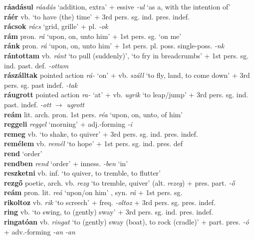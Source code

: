 \documentclass[11pt]{article}
\begin{document}
\textbf{ráadásul} \emph{ráadás} `addition, extra' + essive
  \emph{-ul} `as a, with the intention of' \\
\textbf{ráér} vb. `to have (the) time' + 3rd
pers. sg. ind. pres. indef. \\
\textbf{rácsok} \emph{rács} `grid, grille' + pl. \emph{-ok} \\
\textbf{rám} pron. \emph{rá} `upon, on, unto him' + 1st
pers. sg. `on me' \\
\textbf{ránk} pron. \emph{rá} `upon, on, unto him' + 1st
pers. pl. poss. single\hyp{}poss. \emph{-nk} \\
\textbf{rántottam} vb. \emph{ránt} `to pull (suddenly)', `to fry in
breadcrumbs' + 1st pers. sg. ind. past. def. \emph{-ottam} \\
\textbf{rászálltak} pointed action \emph{rá-} `on' + vb. \emph{száll}
`to fly, land, to come down' + 3rd pers. sg. past indef. \emph{-tak} \\
\textbf{ráugrott} pointed action \emph{ra-} `at' + vb. \emph{ugrik}
`to leap/jump' + 3rd pers. sg. ind. past. indef. \emph{-ott}
$\rightarrow$ \emph{ugrott} \\
\textbf{reám} lit. arch. pron. 1st pers. \emph{réa} `upon, on, unto,
of
him' \\
\textbf{reggeli} \emph{reggel} `morning' + adj.\hyp{}forming \emph{-i} \\
\textbf{remeg} vb. `to shake, to quiver' + 3rd
pers. sg. ind. pres. indef. \\
\textbf{remélem} vb. \emph{remél} `to hope' + 1st
pers. sg. ind. pres. def  \\
\textbf{rend} `order' \\
\textbf{rendben} \emph{rend} `order' + inness. \emph{-ben} `in' \\
\textbf{reszketni} vb. inf. `to quiver, to tremble, to flutter' \\
\textbf{rezgő} poetic, arch. vb. \emph{rezg} `to tremble, quiver'
(alt. \emph{rezeg}) + pres. part. \emph{-ő} \\
\textbf{reám} pron. lit. \emph{reá} `upon/on him' , syn. \emph{rá} +
1st pers. sg. \\
\textbf{rikoltoz} vb. \emph{rik} `to screech' + freq. \emph{-oltoz} +
3rd pers. sg. pres. indef. \\
\textbf{ring} vb. `to swing, to (gently) sway' + 3rd
pers. sg. ind. pres. indef. \\
\textbf{ringatóan} vb. \emph{ringat} `to (gently) sway
(boat), to rock (cradle)' + part. pres. \emph{-ó} +
adv.\hyp{}forming \emph{-an} \emph{-an} \\
\end{document}
